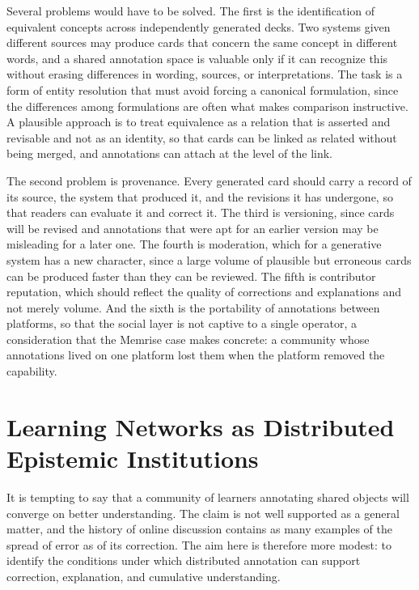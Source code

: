 \documentclass[11pt]{article}
\theoremstyle{remark}
\begin{document}
Several problems would have to be solved. The first is the identification of equivalent concepts across independently generated decks. Two systems given different sources may produce cards that concern the same concept in different words, and a shared annotation space is valuable only if it can recognize this without erasing differences in wording, sources, or interpretations. The task is a form of entity resolution that must avoid forcing a canonical formulation, since the differences among formulations are often what makes comparison instructive. A plausible approach is to treat equivalence as a relation that is asserted and revisable and not as an identity, so that cards can be linked as related without being merged, and annotations can attach at the level of the link.

The second problem is provenance. Every generated card should carry a record of its source, the system that produced it, and the revisions it has undergone, so that readers can evaluate it and correct it. The third is versioning, since cards will be revised and annotations that were apt for an earlier version may be misleading for a later one. The fourth is moderation, which for a generative system has a new character, since a large volume of plausible but erroneous cards can be produced faster than they can be reviewed. The fifth is contributor reputation, which should reflect the quality of corrections and explanations and not merely volume. And the sixth is the portability of annotations between platforms, so that the social layer is not captive to a single operator, a consideration that the Memrise case makes concrete: a community whose annotations lived on one platform lost them when the platform removed the capability.

\section{Learning Networks as Distributed Epistemic Institutions}

It is tempting to say that a community of learners annotating shared objects will converge on better understanding. The claim is not well supported as a general matter, and the history of online discussion contains as many examples of the spread of error as of its correction. The aim here is therefore more modest: to identify the conditions under which distributed annotation can support correction, explanation, and cumulative understanding.
\end{document}

